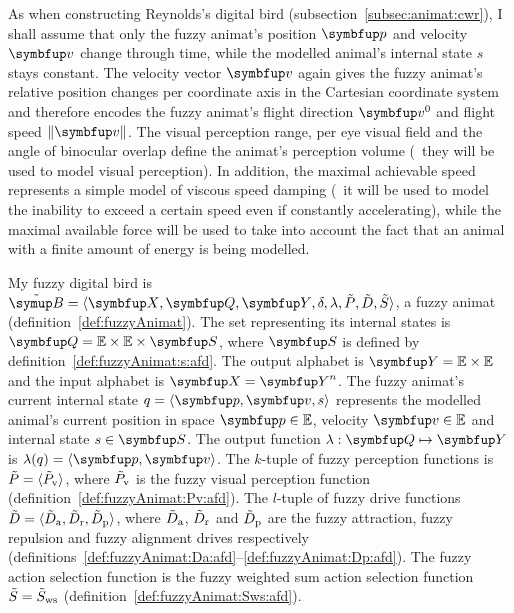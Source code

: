 As when constructing Reynolds's digital bird (subsection~\ref{subsec:animat:cwr}), I shall assume that only the fuzzy animat's position $\vect{p}$ and velocity $\vect{v}$ change through time, while the modelled animal's internal state $s$ stays constant. The velocity vector $\vect{v}$ again gives the fuzzy animat's relative position changes per coordinate axis in the Cartesian coordinate system and therefore encodes the fuzzy animat's flight direction $\vect{v}^0$ and flight speed $\left\|\vect{v}\right\|$. The visual perception range, per eye visual field and the angle of binocular overlap define the animat's perception volume (\ie\ they will be used to model visual perception). In addition, the maximal achievable speed represents a simple model of viscous speed damping (\ie\ it will be used to model the inability to exceed a certain speed even if constantly accelerating), while the maximal available force will be used to take into account the fact that an animal with a finite amount of energy is being modelled.

\begin{definition}
  \label{def:fuzzyAnimat:afd}
  My fuzzy digital bird is $\fautom{B}=\langle\set{X},\set{Q},\set{Y},\delta,\lambda,\ffunc{P},\ffunc{D},\ffunc{S}\rangle$, a fuzzy animat (definition~\ref{def:fuzzyAnimat}). The set representing its internal states is $\set{Q}=\E \times \E \times \set{S}$, where $\set{S}$ is defined by definition~\ref{def:fuzzyAnimat:s:afd}. The output alphabet is $\set{Y}=\E \times \E$ and the input alphabet is $\set{X}=\set{Y}^n$. The fuzzy animat's current internal state $q=\langle\vect{p},\vect{v},s\rangle$ represents the modelled animal's current position in space $\vect{p} \in \E$, velocity $\vect{v} \in \E$ and internal state $s \in \set{S}$. The output function $\lambda: \set{Q} \mapsto \set{Y}$ is $\lambda(q)=\langle\vect{p},\vect{v}\rangle$. The $k$-tuple of fuzzy perception functions is $\tilde{P}=\langle\tilde{P}_\textnormal{v}\rangle$, where $\tilde{P}_\textnormal{v}$ is the fuzzy visual perception function (definition~\ref{def:fuzzyAnimat:Pv:afd}). The $l$-tuple of fuzzy drive functions $\tilde{D}=\langle\tilde{D}_\textnormal{a},\tilde{D}_\textnormal{r},\tilde{D}_\textnormal{p}\rangle$, where $\tilde{D}_\textnormal{a}$, $\tilde{D}_\textnormal{r}$ and $\tilde{D}_\textnormal{p}$ are the fuzzy attraction, fuzzy repulsion and fuzzy alignment drives respectively  (definitions~\ref{def:fuzzyAnimat:Da:afd}--\ref{def:fuzzyAnimat:Dp:afd}). The fuzzy action selection function is the fuzzy weighted sum action selection function $\tilde{S}=\tilde{S}_\textnormal{ws}$ (definition~\ref{def:fuzzyAnimat:Sws:afd}).
\end{definition}

